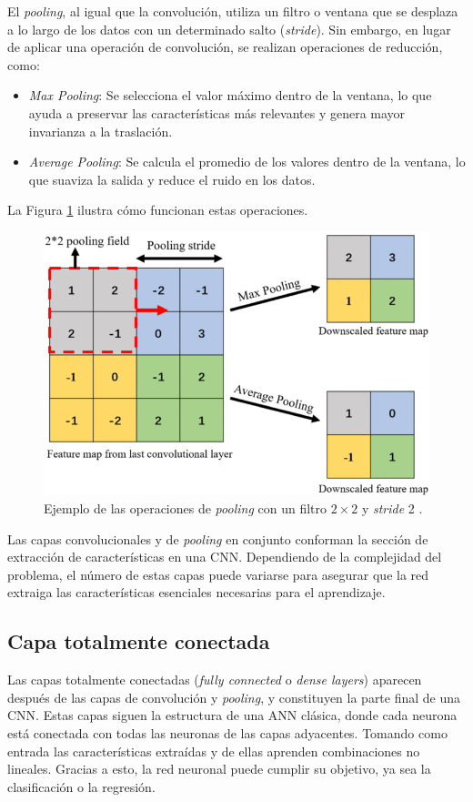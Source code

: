 El \textit{pooling}, al igual que la convolución, utiliza un filtro o ventana que se desplaza a lo largo de los datos con un determinado salto (\textit{stride}). Sin embargo, en lugar de aplicar una operación de convolución, se realizan operaciones de reducción, como:
\begin{itemize}
    \item \textit{Max Pooling}: Se selecciona el valor máximo dentro de la ventana, lo que ayuda a preservar las características más relevantes y genera mayor invarianza a la traslación.
    \item \textit{Average Pooling}: Se calcula el promedio de los valores dentro de la ventana, lo que suaviza la salida y reduce el ruido en los datos.
\end{itemize}
La Figura \ref{fig:poolingExample} ilustra cómo funcionan estas operaciones.

\begin{figure}[h]
    \centering
    \includegraphics[width=\linewidth]{figures/2_theory/poolingExample.png}
    \caption[Ejemplo del operador de pooling]{Ejemplo de las operaciones de \textit{pooling} con un filtro $2\times2$ y \textit{stride} 2 \cite{pooling}.}
    \label{fig:poolingExample}
\end{figure}

Las capas convolucionales y de \textit{pooling} en conjunto conforman la sección de extracción de características en una CNN. Dependiendo de la complejidad del problema, el número de estas capas puede variarse para asegurar que la red extraiga las características esenciales necesarias para el aprendizaje.

\subsection{Capa totalmente conectada}
Las capas totalmente conectadas (\textit{fully connected} o \textit{dense layers}) aparecen después de las capas de convolución y \textit{pooling}, y constituyen la parte final de una CNN. Estas capas siguen la estructura de una ANN clásica, donde cada neurona está conectada con todas las neuronas de las capas adyacentes. Tomando como entrada las características extraídas y de ellas aprenden combinaciones no lineales. Gracias a esto, la red neuronal puede cumplir su objetivo, ya sea la clasificación o la regresión.

